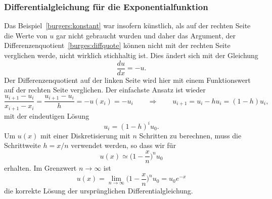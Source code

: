 \subsubsection{Differentialgleichung für die Exponentialfunktion}
Das Beispiel~\eqref{burgers:konstant} war insofern künstlich, als auf der
rechten Seite die Werte von $u$ gar nicht gebraucht wurden und daher das
Argument, der Differenzenquotient~\eqref{burges:diffquote} können nicht
mit der rechten Seite verglichen werde, nicht wirklich stichhaltig ist.
Dies ändert sich mit der Gleichung
\begin{equation}
\frac{du}{dx} = -u.
\label{burgers:expo}
\end{equation}
Der Differenzenquotient auf der linken Seite wird hier mit einem
Funktionswert auf der rechten Seite verglichen. 
Der einfachste Ansatz ist wieder
\[
\frac{u_{i+1}-u_i}{x_{i+1}-x_{i}}
=
\frac{u_{i+1}-u_i}{h} = -u(x_i) = -u_i
\qquad\Rightarrow\qquad
u_{i+1} = u_i-hu_i=(1-h)u_i,
\]
mit der eindeutigen Lösung
\[
u_i = (1-h)^iu_0.
\]
Um $u(x)$ mit einer Diskretisierung mit $n$ Schritten zu berechnen,
muss die Schrittweite $h=x/n$ verwendet werden, so dass wir für
\[
u(x) \simeq \biggl(1-\frac{x}{n}\biggr)^n u_0
\]
erhalten.
Im Grenzwert $n\to\infty$ ist
\[
u(x) = \lim_{n\to\infty} \biggl(1-\frac{x}{n}\biggr)^n u_0 = u_0e^{-x}
\]
die korrekte Lösung der ursprünglichen Differentialgleichung.

